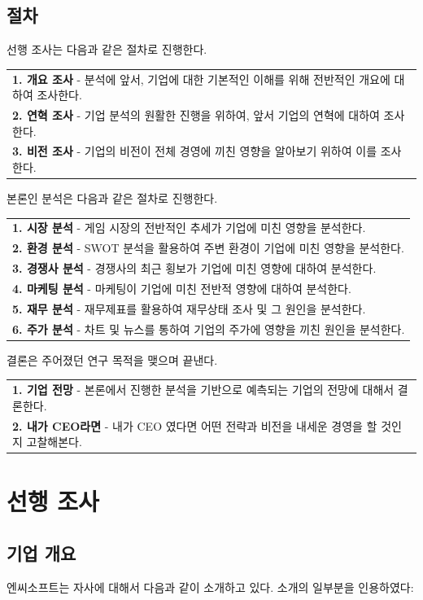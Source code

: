 \documentclass[11pt]{oblivoir}
\newenvironment{textbox}
	{
	\begin{center}
		\begin{tabular}{|p{0.95\textwidth}|}
			\hline
	}
	{
		\\ \hline
		\end{tabular}
		\end{center}
	}
\begin{document}
		\subsection{절차}
			선행 조사는 다음과 같은 절차로 진행한다.
			\begin{textbox}
				\textbf{1. 개요 조사} - 분석에 앞서, 기업에 대한 기본적인 이해를 위해 전반적인 개요에 대하여 조사한다.
				\\
				\textbf{2. 연혁 조사} - 기업 분석의 원활한 진행을 위하여, 앞서 기업의 연혁에 대하여 조사한다.
				\\
				\textbf{3. 비전 조사} - 기업의 비전이 전체 경영에 끼친 영향을 알아보기 위하여 이를 조사한다.
			\end{textbox}
			본론인 분석은 다음과 같은 절차로 진행한다.
			\begin{textbox}
				\textbf{1. 시장 분석} - 게임 시장의 전반적인 추세가 기업에 미친 영향을 분석한다.
				\\
				\textbf{2. 환경 분석} - SWOT 분석을 활용하여 주변 환경이 기업에 미친 영향을 분석한다.
				\\ 
				\textbf{3. 경쟁사 분석} - 경쟁사의 최근 횡보가 기업에 미친 영향에 대하여 분석한다.
				\\
				\textbf{4. 마케팅 분석} - 마케팅이 기업에 미친 전반적 영향에 대하여 분석한다.
				\\
				\textbf{5. 재무 분석} - 재무제표를 활용하여 재무상태 조사 및 그 원인을 분석한다.
				\\
				\textbf{6. 주가 분석} - 차트 및 뉴스를 통하여 기업의 주가에 영향을 끼친 원인을 분석한다.
			\end{textbox}
			결론은 주어졌던 연구 목적을 맺으며 끝낸다.
			\begin{textbox}
				\textbf{1. 기업 전망} - 본론에서 진행한 분석을 기반으로 예측되는 기업의 전망에 대해서 결론한다.
				\\
				\textbf{2. 내가 CEO라면} - 내가 CEO 였다면 어떤 전략과 비전을 내세운 경영을 할 것인지 고찰해본다. 
			\end{textbox}
	
	\section{선행 조사}
		\subsection{기업 개요}
		\noindent 엔씨소프트는 자사에 대해서 다음과 같이 소개하고 있다. 소개의 일부분을 인용하였다:
		
\end{document}
